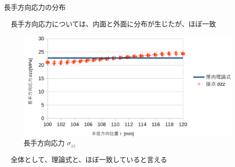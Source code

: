 \begin{frame}{長手方向応力の分布}
 
　長手方向応力については、内面と外面に分布が生じたが、ほぼ一致
\begin{figure}[htbp]
\centering
  \begin{minipage}{0.49\columnwidth}
     \centering
     \includegraphics[width=\columnwidth]{images/results03.png}
     \caption{長手方向応力
       \begin{math}
         σ_{zz}
       \end{math}
     }
  \end{minipage}
%
  \begin{minipage}{0.49\columnwidth}
  \end{minipage}
\end{figure}

　全体として、理論式と、ほぼ一致していると言える

\end{frame}
